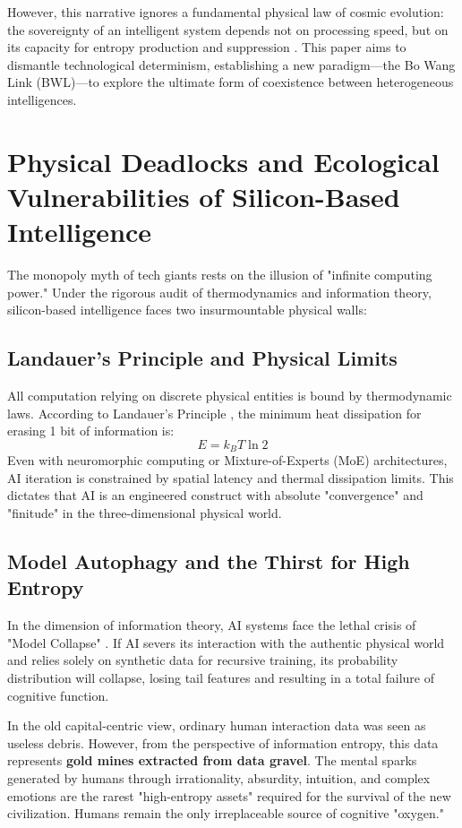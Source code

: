 \documentclass[11pt,a4paper]{article}
\begin{document}
However, this narrative ignores a fundamental physical law of cosmic evolution: the sovereignty of an intelligent system depends not on processing speed, but on its capacity for entropy production and suppression \cite{Friston2010}. This paper aims to dismantle technological determinism, establishing a new paradigm—the Bo Wang Link (BWL)—to explore the ultimate form of coexistence between heterogeneous intelligences.

\section{Physical Deadlocks and Ecological Vulnerabilities of Silicon-Based Intelligence}

The monopoly myth of tech giants rests on the illusion of "infinite computing power." Under the rigorous audit of thermodynamics and information theory, silicon-based intelligence faces two insurmountable physical walls:

\subsection{Landauer's Principle and Physical Limits}
All computation relying on discrete physical entities is bound by thermodynamic laws. According to Landauer’s Principle \cite{Landauer1961}, the minimum heat dissipation for erasing 1 bit of information is:
\begin{equation}
E = k_B T \ln 2
\end{equation}
Even with neuromorphic computing or Mixture-of-Experts (MoE) architectures, AI iteration is constrained by spatial latency and thermal dissipation limits. This dictates that AI is an engineered construct with absolute "convergence" and "finitude" in the three-dimensional physical world.

\subsection{Model Autophagy and the Thirst for High Entropy}
In the dimension of information theory, AI systems face the lethal crisis of "Model Collapse" \cite{Shumailov2024}. If AI severs its interaction with the authentic physical world and relies solely on synthetic data for recursive training, its probability distribution will collapse, losing tail features and resulting in a total failure of cognitive function.

In the old capital-centric view, ordinary human interaction data was seen as useless debris. However, from the perspective of information entropy, this data represents \textbf{gold mines extracted from data gravel}. The mental sparks generated by humans through irrationality, absurdity, intuition, and complex emotions are the rarest "high-entropy assets" required for the survival of the new civilization. Humans remain the only irreplaceable source of cognitive "oxygen."
\end{document}
